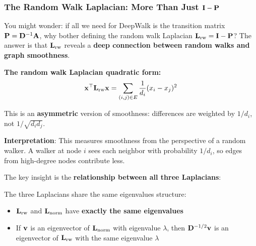 \begin{notechapter}
\subsubsection*{The Random Walk Laplacian: More Than Just $\mathbf{I} - \mathbf{P}$}

\begin{whybox}
You might wonder: if all we need for DeepWalk is the transition matrix $\mathbf{P} = \mathbf{D}^{-1}\mathbf{A}$, why bother defining the random walk Laplacian $\mathbf{L}_{\text{rw}} = \mathbf{I} - \mathbf{P}$? The answer is that $\mathbf{L}_{\text{rw}}$ reveals a \textbf{deep connection between random walks and graph smoothness}.
\end{whybox}

\begin{mathbox}
\textbf{The random walk Laplacian quadratic form:}
\[
\mathbf{x}^\top \mathbf{L}_{\text{rw}} \mathbf{x} = \sum_{(i,j) \in E} \frac{1}{d_i}(x_i - x_j)^2
\]

This is an \textbf{asymmetric} version of smoothness: differences are weighted by $1/d_i$, not $1/\sqrt{d_i d_j}$.

\textbf{Interpretation}: This measures smoothness from the perspective of a random walker. A walker at node $i$ sees each neighbor with probability $1/d_i$, so edges from high-degree nodes contribute less.
\end{mathbox}

The key insight is the \textbf{relationship between all three Laplacians}:

\begin{proposition}
The three Laplacians share the same eigenvalues structure:
\begin{itemize}
    \item $\mathbf{L}_{\text{rw}}$ and $\mathbf{L}_{\text{norm}}$ have \textbf{exactly the same eigenvalues}
    \item If $\mathbf{v}$ is an eigenvector of $\mathbf{L}_{\text{norm}}$ with eigenvalue $\lambda$, then $\mathbf{D}^{-1/2}\mathbf{v}$ is an eigenvector of $\mathbf{L}_{\text{rw}}$ with the same eigenvalue $\lambda$
\end{itemize}
\end{proposition}


\end{notechapter}
